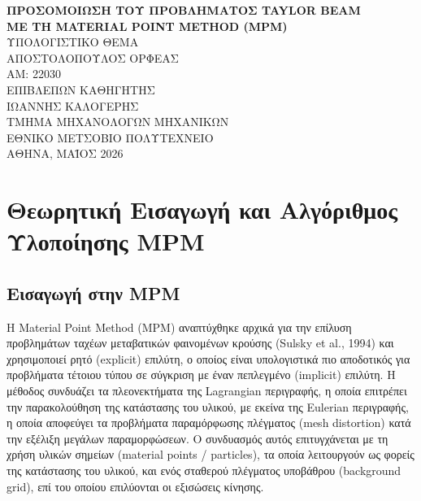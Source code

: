 \documentclass[12pt,a4paper]{report}
\begin{document}
	\setlength{\parindent}{0pt}

	\begin{titlepage}
		\centering
		{\LARGE\bfseries ΠΡΟΣΟΜΟΙΩΣΗ ΤΟΥ ΠΡΟΒΛΗΜΑΤΟΣ TAYLOR BEAM \\[.5cm]
		ΜΕ ΤΗ MATERIAL POINT METHOD (MPM)}\\[3cm]

		{\large ΥΠΟΛΟΓΙΣΤΙΚΟ ΘΕΜΑ}\\[1cm]

		{\large ΑΠΟΣΤΟΛΟΠΟΥΛΟΣ ΟΡΦΕΑΣ}\\[0.5cm]
		{\large ΑΜ: 22030}\\[1.5cm]

		{\large ΕΠΙΒΛΕΠΩΝ ΚΑΘΗΓΗΤΗΣ}\\[0.3cm]
		{\large ΙΩΑΝΝΗΣ ΚΑΛΟΓΕΡΗΣ}\\[4.5cm]

		{\large ΤΜΗΜΑ ΜΗΧΑΝΟΛΟΓΩΝ ΜΗΧΑΝΙΚΩΝ}\\
		{\large ΕΘΝΙΚΟ ΜΕΤΣΟΒΙΟ ΠΟΛΥΤΕΧΝΕΙΟ}\\[3cm]

		{\large ΑΘΗΝΑ, ΜΑΪΟΣ 2026}
	\end{titlepage}

	\tableofcontents
	\newpage

	\section{Θεωρητική Εισαγωγή και Αλγόριθμος Υλοποίησης MPM}

	\subsection{Εισαγωγή στην MPM}

	Η Material Point Method (MPM) αναπτύχθηκε αρχικά για την επίλυση προβλημάτων ταχέων μεταβατικών φαινομένων κρούσης (Sulsky et al., 1994) και χρησιμοποιεί ρητό (explicit) επιλύτη, ο οποίος είναι υπολογιστικά πιο αποδοτικός για προβλήματα τέτοιου τύπου σε σύγκριση με έναν πεπλεγμένο (implicit) επιλύτη. Η μέθοδος συνδυάζει τα πλεονεκτήματα της Lagrangian περιγραφής, η οποία επιτρέπει την παρακολούθηση της κατάστασης του υλικού, με εκείνα της Eulerian περιγραφής, η οποία αποφεύγει τα προβλήματα παραμόρφωσης πλέγματος (mesh distortion) κατά την εξέλιξη μεγάλων παραμορφώσεων. Ο συνδυασμός αυτός επιτυγχάνεται με τη χρήση υλικών σημείων (material points / particles), τα οποία λειτουργούν ως φορείς της κατάστασης του υλικού, και ενός σταθερού πλέγματος υποβάθρου (background grid), επί του οποίου επιλύονται οι εξισώσεις κίνησης.
\end{document}
